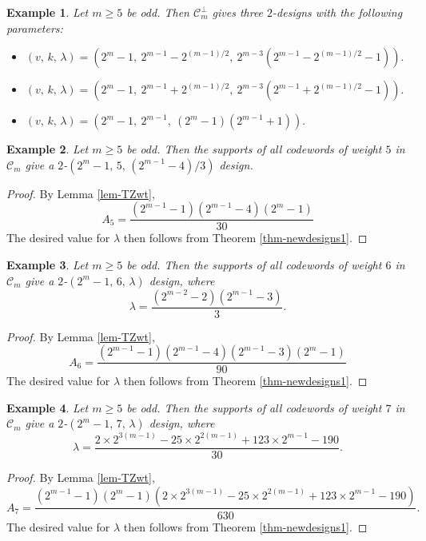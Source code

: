 \documentclass[1p,final]{elsarticle}
\newtheorem{example}{Example}
\newcommand{\C}{{\mathcal{C}}}
\begin{document}
\begin{example} 
Let $m \geq 5$ be odd. 
Then $\C_m^\perp$ gives three $2$-designs with the following parameters: 
\begin{itemize}
\item $(v,\, k, \, \lambda)=\left(2^m-1,\  2^{m-1}-2^{(m-1)/2}, \  2^{m-3} (2^{m-1} - 2^{(m-1)/2} -1)  \right).$
\item $(v, \, k, \, \lambda)=\left(2^m-1, \ 2^{m-1}+2^{(m-1)/2}, \  2^{m-3} (2^{m-1} + 2^{(m-1)/2} -1)  \right).$ 
\item $(v, \, k, \, \lambda)=\left(2^m-1, \ 2^{m-1}, \  (2^m-1)(2^{m-1}+1) \right).$  
\end{itemize} 
\end{example} 


\begin{example} 
Let $m \geq 5$ be odd. 
Then the supports of all codewords of weight $5$ in $\C_m$ give a $2$-$(2^m-1,\, 5,\, (2^{m-1}-4)/3)$ design. 
\end{example} 

\begin{proof}
By Lemma  \ref{lem-TZwt}, 
$$ 
A_5 = \frac{(2^{m-1}-1) (2^{m-1}-4) (2^m-1)}{30}
$$
The desired value for $\lambda$ then follows from Theorem \ref{thm-newdesigns1}. 
\end{proof}

\begin{example} 
Let $m \geq 5$ be odd. 
Then the supports of all codewords of weight $6$ in $\C_m$ give a $2$-$(2^m-1,\, 6,\, \lambda)$ design, where 
$$ 
\lambda= \frac{(2^{m-2}-2)(2^{m-1}-3)}{3}. 
$$
\end{example} 



\begin{proof}
By Lemma  \ref{lem-TZwt}, 
$$ 
A_6 = \frac{(2^{m-1}-1) (2^{m-1}-4) (2^{m-1}-3)  (2^m-1)}{90}
$$
The desired value for $\lambda$ then follows from Theorem \ref{thm-newdesigns1}. 
\end{proof}


\begin{example} 
Let $m \geq 5$ be odd. 
Then the supports of all codewords of weight $7$ in $\C_m$ give a $2$-$(2^m-1,\, 7,\, \lambda)$ design, where 
$$ 
\lambda= \frac{2 \times 2^{3(m-1)} - 25 \times 2^{2(m-1)} + 123 \times 2^{m-1} - 190}{30}. 
$$
\end{example} 

\begin{proof}
By Lemma  \ref{lem-TZwt}, 
$$ 
A_7 = \frac{(2^{m-1}-1) (2^m-1) (2 \times 2^{3(m-1)} - 25 \times 2^{2(m-1)} + 123 \times 2^{m-1} - 190)}{630}. 
$$
The desired value for $\lambda$ then follows from Theorem \ref{thm-newdesigns1}. 
\end{proof}
\end{document}
